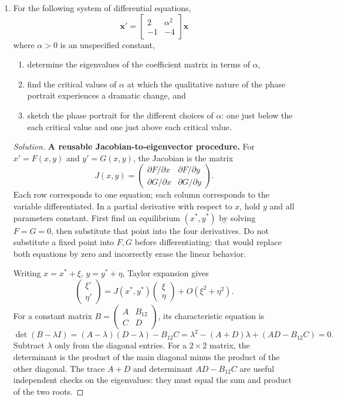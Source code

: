 \documentclass[10pt]{amsart}
\newenvironment{solution}
{\begin{proof}[Solution]}
{\end{proof}}
\begin{document}
\begin{enumerate}[label=\arabic*), leftmargin=*, itemsep=1em]
    \item For the following system of differential equations,
    \[
        \mathbf{x}' = \begin{bmatrix}2 & \alpha^2 \\ -1 & -4\end{bmatrix}\mathbf{x}
    \]
    where $\alpha>0$ is an unspecified constant,
    \begin{enumerate}[label=(\alph*)]
        \item determine the eigenvalues of the coefficient matrix in terms of $\alpha$,
        \item find the critical values of $\alpha$ at which the qualitative nature of the phase portrait experiences a dramatic change, and
        \item sketch the phase portrait for the different choices of $\alpha$: one just below the each critical value and one just above each critical value.
    \end{enumerate}

    \begin{solution}

\noindent\textbf{A reusable Jacobian-to-eigenvector procedure.}
For $x'=F(x,y)$ and $y'=G(x,y)$, the Jacobian is the matrix
\[
J(x,y)=\begin{pmatrix}
\partial F/\partial x&\partial F/\partial y\\
\partial G/\partial x&\partial G/\partial y
\end{pmatrix}.
\]
Each row corresponds to one equation; each column corresponds to the variable differentiated. In a partial derivative with respect to $x$, hold $y$ and all parameters constant. First find an equilibrium $(x^*,y^*)$ by solving $F=G=0$, then substitute that point into the four derivatives. Do not substitute a fixed point into $F,G$ before differentiating: that would replace both equations by zero and incorrectly erase the linear behavior.

Writing $x=x^*+\xi$, $y=y^*+\eta$, Taylor expansion gives
\[
\begin{pmatrix}\xi'\\\eta'\end{pmatrix}
=J(x^*,y^*)\begin{pmatrix}\xi\\\eta\end{pmatrix}
+O(\xi^2+\eta^2).
\]
For a constant matrix $B=\begin{pmatrix}A&B_{12}\\C&D\end{pmatrix}$, its characteristic equation is
\[
\det(B-\lambda I)=(A-\lambda)(D-\lambda)-B_{12}C
=\lambda^2-(A+D)\lambda+(AD-B_{12}C)=0.
\]
Subtract $\lambda$ only from the diagonal entries. For a $2\times2$ matrix, the determinant is the product of the main diagonal minus the product of the other diagonal. The trace $A+D$ and determinant $AD-B_{12}C$ are useful independent checks on the eigenvalues: they must equal the sum and product of the two roots.


\end{solution}
\end{enumerate}
\end{document}
